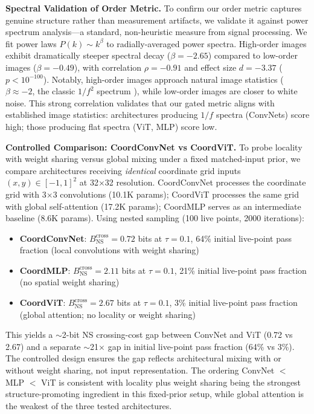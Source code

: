 \documentclass{article}
\begin{document}
\textbf{Spectral Validation of Order Metric.} To confirm our order metric captures genuine structure rather than measurement artifacts, we validate it against power spectrum analysis---a standard, non-heuristic measure from signal processing. We fit power laws $P(k) \sim k^\beta$ to radially-averaged power spectra. High-order images exhibit dramatically steeper spectral decay ($\beta = -2.65$) compared to low-order images ($\beta = -0.49$), with correlation $\rho = -0.91$ and effect size $d = -3.37$ ($p < 10^{-100}$). Notably, high-order images approach natural image statistics ($\beta \approx -2$, the classic $1/f^2$ spectrum \cite{field1987relations}), while low-order images are closer to white noise. This strong correlation validates that our gated metric aligns with established image statistics: architectures producing $1/f$ spectra (ConvNets) score high; those producing flat spectra (ViT, MLP) score low.

\textbf{Controlled Comparison: CoordConvNet vs CoordViT.} To probe locality with weight sharing versus global mixing under a fixed matched-input prior, we compare architectures receiving \emph{identical} coordinate grid inputs $(x,y) \in [-1,1]^2$ at 32$\times$32 resolution. CoordConvNet processes the coordinate grid with 3$\times$3 convolutions (10.1K params); CoordViT processes the same grid with global self-attention (17.2K params); CoordMLP serves as an intermediate baseline (8.6K params). Using nested sampling (100 live points, 2000 iterations):

\begin{itemize}[topsep=2pt, itemsep=2pt]
    \item \textbf{CoordConvNet}: $B_{\text{NS}}^{\text{cross}}=0.72$ bits at $\tau=0.1$, 64\% initial live-point pass fraction (local convolutions with weight sharing)
    \item \textbf{CoordMLP}: $B_{\text{NS}}^{\text{cross}}=2.11$ bits at $\tau=0.1$, 21\% initial live-point pass fraction (no spatial weight sharing)
    \item \textbf{CoordViT}: $B_{\text{NS}}^{\text{cross}}=2.67$ bits at $\tau=0.1$, 3\% initial live-point pass fraction (global attention; no locality or weight sharing)
\end{itemize}

This yields a $\sim$2-bit NS crossing-cost gap between ConvNet and ViT (0.72 vs 2.67) and a separate $\sim$21$\times$ gap in initial live-point pass fraction (64\% vs 3\%). The controlled design ensures the gap reflects architectural mixing with or without weight sharing, not input representation. The ordering ConvNet $<$ MLP $<$ ViT is consistent with locality plus weight sharing being the strongest structure-promoting ingredient in this fixed-prior setup, while global attention is the weakest of the three tested architectures.
\end{document}
